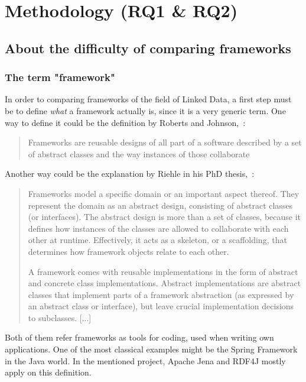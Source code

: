 \chapter{Methodology (RQ1 \& RQ2)}
\section{About the difficulty of comparing frameworks}\label{def:framework}

\subsection{The term "framework"}

In order to comparing frameworks of the field of Linked Data, a first step must be to define \emph{what} a framework actually is, since it is a very generic term. One way to define it could be the definition by Roberts and Johnson,~\cite{roberts1996evolving}:

\begin{quotation}
Frameworks are reusable designs of all part of a software described by a set of abstract classes and the way instances of those collaborate
\end{quotation}

Another way could be the explanation by Riehle in his PhD thesis,~\cite{riehle2000framework}:

\begin{quotation}
Frameworks model a specific domain or an important aspect thereof. They represent the domain as an abstract design, consisting of abstract classes (or interfaces). The abstract design is more than a set of classes, because it defines how instances of the classes are allowed to collaborate with each other at runtime. Effectively, it acts as a skeleton, or a scaffolding, that determines how framework objects relate to each other.

A framework comes with reusable implementations in the form of abstract and concrete class implementations. Abstract implementations are abstract classes that implement parts of a framework abstraction (as expressed by an abstract class or interface), but leave crucial implementation decisions to subclasses. [...]
\end{quotation}

Both of them refer frameworks as tools for coding, used when writing own applications. One of the most classical examples might be the Spring Framework in the Java world. In the mentioned project, Apache Jena and RDF4J mostly apply on this definition.

